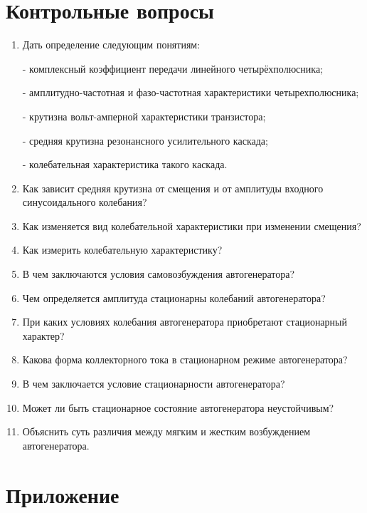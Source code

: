 \section{Контрольные вопросы}
\begin{enumerate}
	\item Дать определение следующим понятиям:

	- комплексный коэффициент передачи линейного четырёхполюсника; 

	- амплитудно-частотная и фазо-частотная характеристики четырехполюсника;

	- крутизна вольт-амперной характеристики транзистора;

	- средняя крутизна резонансного усилительного каскада;

	- колебательная характеристика такого каскада.
	\item Как зависит средняя крутизна от смещения и от амплитуды входного синусоидального колебания?
	\item Как изменяется вид колебательной характеристики при изменении смещения?
	\item Как измерить колебательную характеристику?
	\item В чем заключаются условия самовозбуждения автогенератора?
	\item Чем определяется амплитуда стационарны колебаний автогенератора?
	\item При каких условиях колебания автогенератора приобретают стационарный характер?
	\item Какова форма коллекторного тока в стационарном режиме автогенератора?
	\item В чем заключается условие стационарности автогенератора?
	\item Может ли быть стационарное состояние автогенератора неустойчивым?
	\item Объяснить суть различия между мягким и жестким возбуждением автогенератора.
\end{enumerate}
\section{Приложение}

